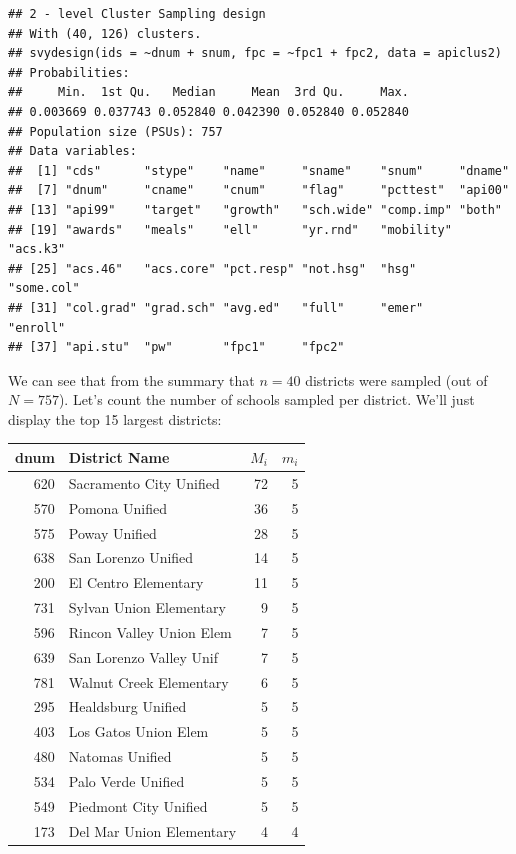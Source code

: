 \documentclass[
]{book}
\begin{document}
\begin{verbatim}
## 2 - level Cluster Sampling design
## With (40, 126) clusters.
## svydesign(ids = ~dnum + snum, fpc = ~fpc1 + fpc2, data = apiclus2)
## Probabilities:
##     Min.  1st Qu.   Median     Mean  3rd Qu.     Max. 
## 0.003669 0.037743 0.052840 0.042390 0.052840 0.052840 
## Population size (PSUs): 757 
## Data variables:
##  [1] "cds"      "stype"    "name"     "sname"    "snum"     "dname"   
##  [7] "dnum"     "cname"    "cnum"     "flag"     "pcttest"  "api00"   
## [13] "api99"    "target"   "growth"   "sch.wide" "comp.imp" "both"    
## [19] "awards"   "meals"    "ell"      "yr.rnd"   "mobility" "acs.k3"  
## [25] "acs.46"   "acs.core" "pct.resp" "not.hsg"  "hsg"      "some.col"
## [31] "col.grad" "grad.sch" "avg.ed"   "full"     "emer"     "enroll"  
## [37] "api.stu"  "pw"       "fpc1"     "fpc2"
\end{verbatim}

We can see that from the summary that \(n=40\) districts were sampled (out of \(N=757\)).
Let's count the number of schools sampled per district. We'll just display the top 15 largest
districts:

\begin{table}
\centering
\begin{tabular}[t]{r|l|r|r}
\hline
dnum & District Name & $M_i$ & $m_i$\\
\hline
620 & Sacramento City Unified & 72 & 5\\
\hline
570 & Pomona Unified & 36 & 5\\
\hline
575 & Poway Unified & 28 & 5\\
\hline
638 & San Lorenzo Unified & 14 & 5\\
\hline
200 & El Centro Elementary & 11 & 5\\
\hline
731 & Sylvan Union Elementary & 9 & 5\\
\hline
596 & Rincon Valley Union Elem & 7 & 5\\
\hline
639 & San Lorenzo Valley Unif & 7 & 5\\
\hline
781 & Walnut Creek Elementary & 6 & 5\\
\hline
295 & Healdsburg Unified & 5 & 5\\
\hline
403 & Los Gatos Union Elem & 5 & 5\\
\hline
480 & Natomas Unified & 5 & 5\\
\hline
534 & Palo Verde Unified & 5 & 5\\
\hline
549 & Piedmont City Unified & 5 & 5\\
\hline
173 & Del Mar Union Elementary & 4 & 4\\
\hline
\end{tabular}
\end{table}
\end{document}
